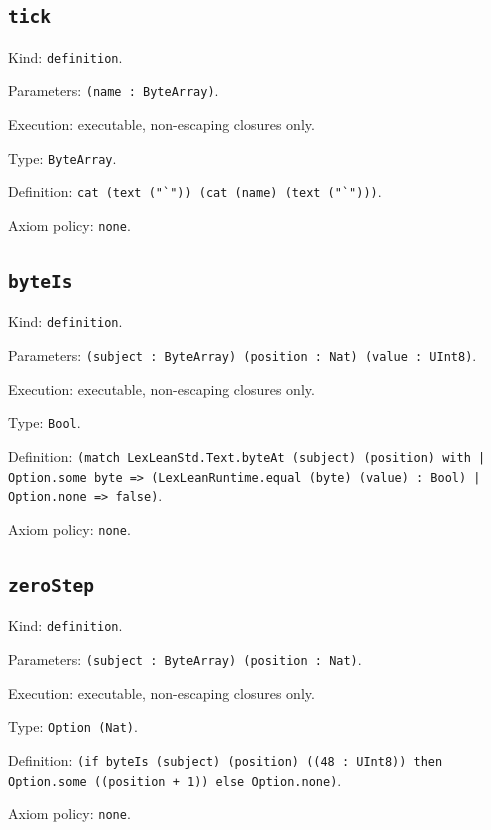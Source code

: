 \documentclass[11pt]{article}
\begin{document}
\subsection*{\texttt{tick}}
\noindent Kind: \texttt{definition}.\par
\noindent Parameters: \texttt{(name : ByteArray)}.\par
\noindent Execution: executable, non-escaping closures only.\par
\noindent Type: \texttt{ByteArray}.\par
\noindent Definition: \texttt{cat (text ("`")) (cat (name) (text ("`")))}.\par
\noindent Axiom policy: \texttt{none}.\par
\subsection*{\texttt{byteIs}}
\noindent Kind: \texttt{definition}.\par
\noindent Parameters: \texttt{(subject : ByteArray) (position : Nat) (value : UInt8)}.\par
\noindent Execution: executable, non-escaping closures only.\par
\noindent Type: \texttt{Bool}.\par
\noindent Definition: \texttt{(match LexLeanStd.Text.byteAt (subject) (position) with | Option.some byte => (LexLeanRuntime.equal (byte) (value) : Bool) | Option.none => false)}.\par
\noindent Axiom policy: \texttt{none}.\par
\subsection*{\texttt{zeroStep}}
\noindent Kind: \texttt{definition}.\par
\noindent Parameters: \texttt{(subject : ByteArray) (position : Nat)}.\par
\noindent Execution: executable, non-escaping closures only.\par
\noindent Type: \texttt{Option (Nat)}.\par
\noindent Definition: \texttt{(if byteIs (subject) (position) ((48 : UInt8)) then Option.some ((position + 1)) else Option.none)}.\par
\noindent Axiom policy: \texttt{none}.\par
\end{document}

